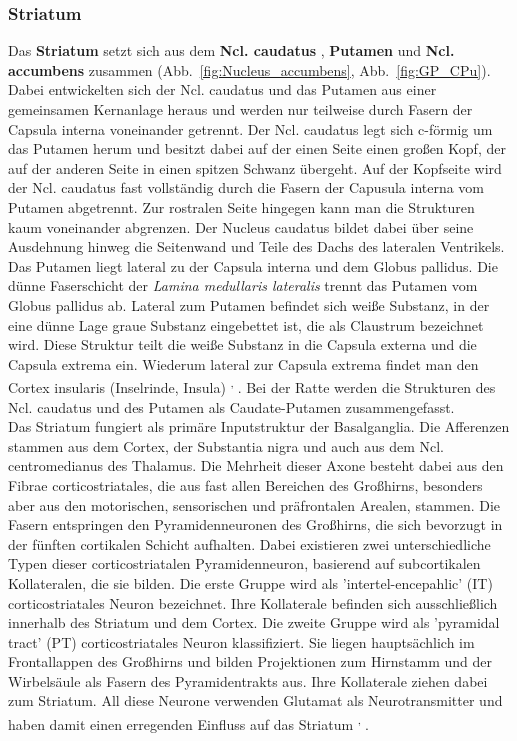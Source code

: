 \documentclass[12pt,a4paper,pdftex]{article}
\begin{document}
\subsubsection*{Striatum} 
Das \textbf{Striatum} setzt sich aus dem \textbf{Ncl. caudatus} , \textbf{Putamen}  und \textbf{Ncl. accumbens}  zusammen (Abb.~\ref{fig:Nucleus_accumbens}, Abb.~\ref{fig:GP_CPu}). Dabei entwickelten sich der Ncl. caudatus und das Putamen aus einer gemeinsamen Kernanlage heraus und werden nur teilweise durch Fasern der Capsula interna voneinander getrennt. Der Ncl. caudatus legt sich c-förmig um das Putamen herum und besitzt dabei auf der einen Seite einen großen Kopf, der auf der anderen Seite in einen spitzen Schwanz übergeht. Auf der Kopfseite wird der Ncl. caudatus fast vollständig durch die Fasern der Capusula interna vom Putamen abgetrennt. Zur rostralen Seite hingegen kann man die Strukturen kaum voneinander abgrenzen. Der Nucleus caudatus bildet dabei über seine Ausdehnung hinweg die Seitenwand und Teile des Dachs des lateralen Ventrikels. Das Putamen liegt lateral zu der Capsula interna und dem Globus pallidus. Die dünne Faserschicht der \textit{Lamina medullaris lateralis} trennt das Putamen vom Globus pallidus ab. Lateral zum Putamen befindet sich weiße Substanz, in der eine dünne Lage graue Substanz eingebettet ist, die als Claustrum bezeichnet wird. Diese Struktur teilt die weiße Substanz in die Capsula externa und die Capsula extrema ein. Wiederum lateral zur Capsula extrema findet man den Cortex insularis (Inselrinde, Insula)  \textsuperscript{\cite[14]{crossman2014neuroanatomy}, \cite[9]{trepel2011neuroanatomie}}. Bei der Ratte werden die Strukturen des Ncl. caudatus und des Putamen als Caudate-Putamen zusammengefasst.\\    
Das Striatum fungiert als primäre Inputstruktur der Basalganglia. Die Afferenzen stammen aus dem Cortex, der Substantia nigra und auch aus dem Ncl. centromedianus des Thalamus. Die Mehrheit dieser Axone besteht dabei aus den Fibrae corticostriatales, die aus fast allen Bereichen des Großhirns, besonders aber aus den motorischen, sensorischen und präfrontalen Arealen, stammen. Die Fasern entspringen den Pyramidenneuronen des Großhirns, die sich bevorzugt in der fünften cortikalen Schicht aufhalten. Dabei existieren zwei unterschiedliche Typen dieser corticostriatalen Pyramidenneuron, basierend auf subcortikalen Kollateralen, die sie bilden. Die erste Gruppe wird als 'intertel-encepahlic' (IT) corticostriatales Neuron bezeichnet. Ihre Kollaterale befinden sich ausschließlich innerhalb des Striatum und dem Cortex. Die zweite Gruppe wird als 'pyramidal tract' (PT) corticostriatales Neuron klassifiziert. Sie liegen hauptsächlich im Frontallappen des Großhirns und bilden Projektionen zum Hirnstamm und der Wirbelsäule als Fasern des Pyramidentrakts aus. Ihre Kollaterale ziehen dabei zum Striatum. All diese Neurone verwenden Glutamat als Neurotransmitter und haben damit einen erregenden Einfluss auf das Striatum \textsuperscript{\cite[9]{trepel2011neuroanatomie}, \cite[17]{paxinos2014rat}}.\\
\end{document}
